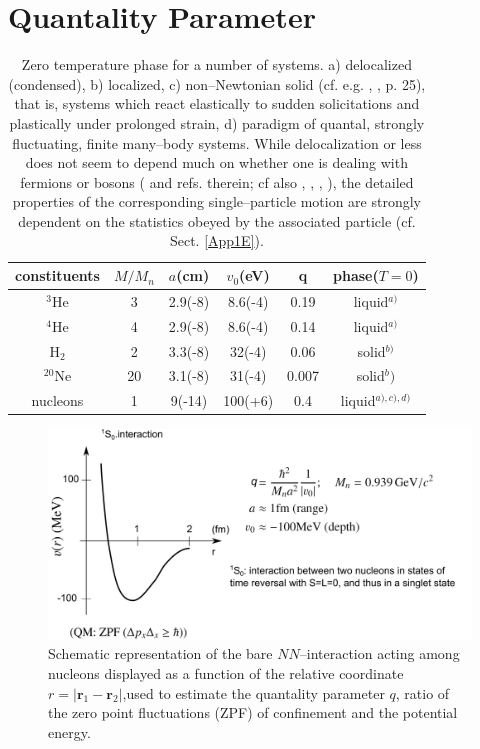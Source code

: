 \section{Quantality Parameter}\label{App1A}
\begin{table}
 \begin{tabular}{|c|c|c|c|c|c|}
 \hline \rule[-2ex]{0pt}{5.5ex}   constituents& $M/M_n$  & $a$(cm) &$v_0$(eV)  &q&phase($T=0$)    \\ 
 \hline \rule[-2ex]{0pt}{5.5ex}   $^{3}$He &3& 2.9(-8)  &8.6(-4)  &0.19  &liquid$^{a)}$    \\ 
 \hline \rule[-2ex]{0pt}{5.5ex}  $^{4}$He  &4&  2.9(-8)&  8.6(-4)&  0.14& liquid$^{a)}$   \\ 
 \hline \rule[-2ex]{0pt}{5.5ex}    H$_2$&2&  3.3(-8)&  32(-4)&  0.06&solid$^{b)}$   \\ 
 \hline \rule[-2ex]{0pt}{5.5ex}    $^{20}$Ne&20& 3.1(-8) &  31(-4)&  0.007&solid$^b)$    \\ 
 \hline \rule[-2ex]{0pt}{5.5ex}    nucleons&1&  9(-14)& 100(+6) &  0.4&liquid$^{a),c),d)}$  \\ 
 \hline 
 \end{tabular}
 \caption{Zero temperature phase for a number of systems. a) delocalized (condensed), b) localized, c) non--Newtonian solid (cf. e.g. \cite{Bertsch:88b}, \cite{DeGennes:94}, p. 25), that is, systems which react elastically to sudden solicitations and plastically under prolonged strain, d) paradigm of quantal, strongly fluctuating, finite many--body  systems. While delocalization or less does not seem to depend much on whether one is dealing with fermions or bosons (\cite{Mottelson:02} and refs. therein; cf also \cite{Ebran:14}, \cite{Ebran:14b}, \cite{Ebran:13}, \cite{Ebran:12}), the detailed properties of the corresponding single--particle motion are strongly dependent on the statistics obeyed by the associated particle (cf. Sect. \ref{App1E}).}\label{tab1A1}
 \end{table}
 \begin{figure}
 \centerline{\includegraphics*[width=\textwidth,angle=0]{nutshell/figs/potential.pdf}}
 \caption{Schematic representation of the bare $NN$--interaction acting among nucleons displayed as a function of the relative coordinate $r=|\mathbf{r}_1-\mathbf{r}_2|$,used to estimate the quantality parameter $q$, ratio of the zero point fluctuations (ZPF) of confinement and the potential energy.}\label{fig1A1}
 \end{figure}
